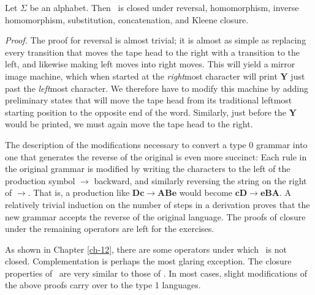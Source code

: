 \begin{thm}\label{thm-11.8}
Let $\Sigma$ be an alphabet. Then \TSIG\ is closed under reversal, homomorphism,
inverse homomorphism, substitution, concatenation, and Kleene closure.

\emph{Proof.} The proof for reversal is almost trivial; it is almost as simple
as replacing every transition that moves the tape head to the right with a
transition to the left, and likewise making left moves into right moves. This
will yield a mirror image machine, which when started at the \emph{right}most
character will print $\pmb{Y}$ just past the \emph{left}most character. We
therefore have to modify this machine by adding preliminary states that will
move the tape head from its traditional leftmost starting position to the
opposite end of the word. Similarly, just before the $\pmb{Y}$ would be printed,
we must again move the tape head to the right.

The description of the modifications necessary to convert a type 0 grammar into
one that generates the reverse of the original is even more succinct: Each rule
in the original grammar is modified by writing the characters to the left of the
production symbol $\rightarrow$ backward, and similarly reversing the string on
the right of $\rightarrow$. That is, a production like $\pmb{Dc}\rightarrow
\pmb{ABe}$ would become $\pmb{cD}\rightarrow\pmb{eBA}$. A relatively trivial
induction on the number of steps in a derivation proves that the new grammar
accepts the reverse of the original language. The proofs of closure under the
remaining operators are left for the exercises.
\end{thm}

As shown in Chapter \ref{ch-12}, there are some operators under which \TSIG\ is not
closed. Complementation is perhaps the most glaring exception. The closure
properties of \LSIG\ are very similar to those of \TSIG. In most cases, slight
modifications of the above proofs carry over to the type 1 languages.

